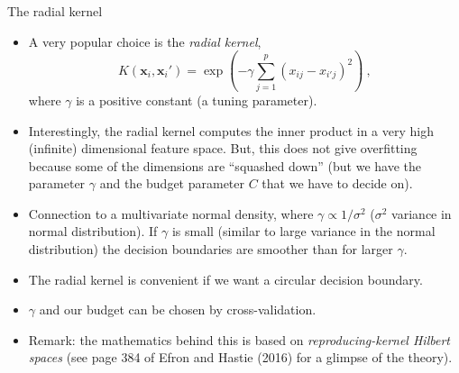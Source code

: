 \documentclass[10pt,ignorenonframetext,]{beamer}
\providecommand{\tightlist}{%
  \setlength{\itemsep}{0pt}\setlength{\parskip}{0pt}}
\begin{document}
\begin{frame}

\begin{block}{The radial kernel}

\begin{itemize}
\tightlist
\item
  A very popular choice is the \emph{radial kernel}, \[
  K({\boldsymbol x}_i,{\boldsymbol x}_i')=\exp(-\gamma \sum_{j=1}^p (x_{ij}-x_{i'j})^2) \ ,
  \] where \(\gamma\) is a positive constant (a tuning parameter).
\end{itemize}

\vspace{1mm}

\begin{itemize}
\tightlist
\item
  Interestingly, the radial kernel computes the inner product in a very
  high (infinite) dimensional feature space. But, this does not give
  overfitting because some of the dimensions are ``squashed down'' (but
  we have the parameter \(\gamma\) and the budget parameter \(C\) that
  we have to decide on).
\end{itemize}

\vspace{1mm}

\begin{itemize}
\tightlist
\item
  Connection to a multivariate normal density, where
  \(\gamma \propto 1/\sigma^2\) (\(\sigma^2\) variance in normal
  distribution). If \(\gamma\) is small (similar to large variance in
  the normal distribution) the decision boundaries are smoother than for
  larger \(\gamma\).
\end{itemize}

\end{block}

\end{frame}

\begin{frame}

\begin{itemize}
\item
  The radial kernel is convenient if we want a circular decision
  boundary.
\item
  \(\gamma\) and our budget can be chosen by cross-validation.
\item
  Remark: the mathematics behind this is based on
  \emph{reproducing-kernel Hilbert spaces} (see page 384 of Efron and
  Hastie (2016) for a glimpse of the theory).
\end{itemize}

\end{frame}
\end{document}
